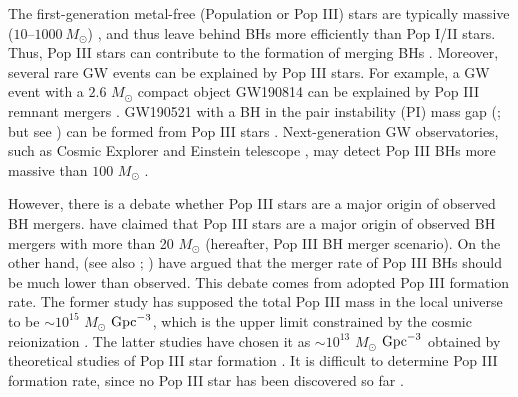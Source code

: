 \documentclass[pdftex]{pasj01}
\newcommand{\msun}{M_\odot}
\newcommand{\cgpc}{{\rm Gpc}^{-3}}
\begin{document}
The first-generation metal-free (Population or Pop III) stars are
typically massive ($10$--$1000~M_{\odot}$) \citep{1998ApJ...508..141O,
  2002Sci...295...93A, 2004ARA&A..42...79B, 2008Sci...321..669Y,
  2011Sci...334.1250H, 2011MNRAS.413..543S, 2013ApJ...773..185S,
  2014ApJ...781...60H}, and thus leave behind BHs more efficiently
than Pop I/II stars. Thus, Pop III stars can contribute to the
formation of merging BHs \citep{2014MNRAS.442.2963K,
  2016MNRAS.460L..74H, 2017MNRAS.471.4702B, 2021ApJ...910...30T,
  2020MNRAS.495.2475L}. Moreover, several rare GW events can be
explained by Pop III stars. For example, a GW event with a $2.6$
$\msun$ compact object GW190814 \citep{2020ApJ...896L..44A} can be
explained by Pop III remnant mergers \citep{2021PTEP.2021b1E01K}.
GW190521 with a BH in the pair instability (PI) mass gap
(\cite{2020PhRvL.125j1102A, 2020ApJ...900L..13A}; but see
\cite{2020ApJ...904L..26F}) can be formed from Pop III stars
\citep{2020ApJ...903L..40L, 2021MNRAS.501L..49K, 2021MNRAS.502L..40F,
  2021MNRAS.505.2170T, 2021arXiv211010846T}. Next-generation GW
observatories, such as Cosmic Explorer \citep{2019BAAS...51g..35R} and
Einstein telescope \citep{2010CQGra..27s4002P}, may detect Pop III BHs
more massive than $100$ $\msun$ \citep{2004ApJ...608L..45B,
  2021MNRAS.505L..69H}.

However, there is a debate whether Pop III stars are a major origin of
observed BH mergers. \citet{2021MNRAS.504L..28K} have claimed that Pop
III stars are a major origin of observed BH mergers with more than 20
$\msun$ (hereafter, Pop III BH merger scenario). On the other hand,
\citet{2016MNRAS.460L..74H} (see also \cite{2021ApJ...910...30T};
\cite{2021MNRAS.501..643L}) have argued that the merger rate of Pop
III BHs should be much lower than observed. This debate comes from
adopted Pop III formation rate. The former study has supposed the
total Pop III mass in the local universe to be $\sim 10^{15}$ $\msun$
$\cgpc$, which is the upper limit constrained by the cosmic
reionization \citep{2011A&A...533A..32D, 2016MNRAS.461.2722I,
  2021ApJ...919...41I}. The latter studies have chosen it as $\sim
10^{13}$ $\msun$ $\cgpc$ obtained by theoretical studies of Pop III
star formation \citep{2016MNRAS.462.3591M, 2020MNRAS.492.4386S,
  2020ApJ...897...95V}. It is difficult to determine Pop III formation
rate, since no Pop III star has been discovered so far
\citep{2015ARA&A..53..631F, 2019MNRAS.487..486M}.
\end{document}
